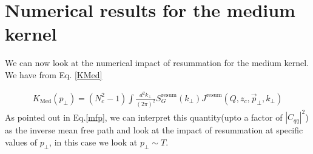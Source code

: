 \documentclass[letter,11pt]{article}
\newcommand{\bea}{\begin{eqnarray}}
\newcommand{\eea}{\end{eqnarray}}
\begin{document}

%


\section{Numerical results for the medium kernel}
\label{sec:Num}

We can now look at the numerical impact of resummation for the medium kernel. 
We have from Eq. \ref{KMed}

\bea
K_{\text{Med}}(p_{\perp}) =(N_c^2-1)\int \frac{d^2k_{\perp}}{(2\pi)^2} S_G^{\text{resum}}(k_{\perp})J^{\text{resum}}(Q, z_{c}, \vec{p}_{\perp}, k_{\perp}) 
\eea
As pointed out in Eq.\ref{mfp}, we can interpret this quantity(upto a factor of $|C_{qq}|^2$) as the inverse mean free path and look at the impact of resummation at specific values of $p_{\perp}$, in this case we look at $p_{\perp} \sim T$.  
\end{document}
